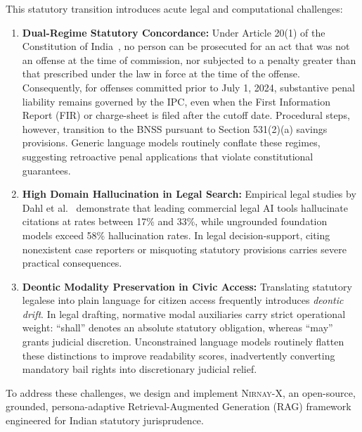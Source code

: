 \documentclass[conference]{IEEEtran}
\begin{document}
This statutory transition introduces acute legal and computational challenges:
\begin{enumerate}
    \item \textbf{Dual-Regime Statutory Concordance:} Under Article 20(1) of the Constitution of India~\cite{constitution1950}, no person can be prosecuted for an act that was not an offense at the time of commission, nor subjected to a penalty greater than that prescribed under the law in force at the time of the offense. Consequently, for offenses committed prior to July 1, 2024, substantive penal liability remains governed by the IPC, even when the First Information Report (FIR) or charge-sheet is filed after the cutoff date. Procedural steps, however, transition to the BNSS pursuant to Section 531(2)(a) savings provisions. Generic language models routinely conflate these regimes, suggesting retroactive penal applications that violate constitutional guarantees.
    \item \textbf{High Domain Hallucination in Legal Search:} Empirical legal studies by Dahl et al.~\cite{dahl2024large} demonstrate that leading commercial legal AI tools hallucinate citations at rates between 17\% and 33\%, while ungrounded foundation models exceed 58\% hallucination rates. In legal decision-support, citing nonexistent case reporters or misquoting statutory provisions carries severe practical consequences.
    \item \textbf{Deontic Modality Preservation in Civic Access:} Translating statutory legalese into plain language for citizen access frequently introduces \textit{deontic drift}. In legal drafting, normative modal auxiliaries carry strict operational weight: ``shall'' denotes an absolute statutory obligation, whereas ``may'' grants judicial discretion. Unconstrained language models routinely flatten these distinctions to improve readability scores, inadvertently converting mandatory bail rights into discretionary judicial relief.
\end{enumerate}

To address these challenges, we design and implement \textsc{Nirnay-X}, an open-source, grounded, persona-adaptive Retrieval-Augmented Generation (RAG) framework engineered for Indian statutory jurisprudence. 
\end{document}
